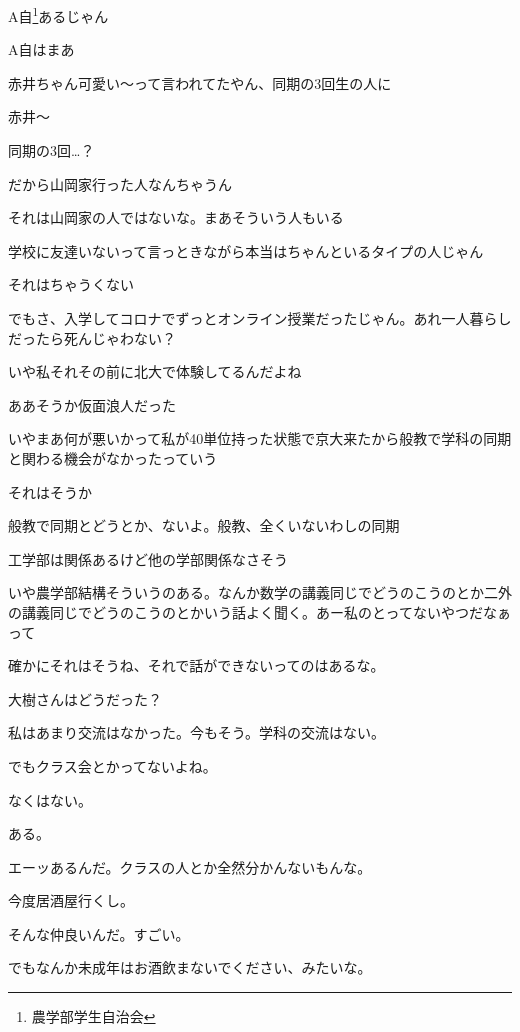 \begin{multicols}{3}
A自\footnote{農学部学生自治会}あるじゃん

A自はまあ

赤井ちゃん可愛い～って言われてたやん、同期の3回生の人に

赤井～

同期の3回…？

だから山岡家行った人なんちゃうん

それは山岡家の人ではないな。まあそういう人もいる

学校に友達いないって言っときながら本当はちゃんといるタイプの人じゃん

それはちゃうくない

でもさ、入学してコロナでずっとオンライン授業だったじゃん。あれ一人暮らしだったら死んじゃわない？

いや私それその前に北大で体験してるんだよね

ああそうか仮面浪人だった

いやまあ何が悪いかって私が40単位持った状態で京大来たから般教で学科の同期と関わる機会がなかったっていう

それはそうか

般教で同期とどうとか、ないよ。般教、全くいないわしの同期

工学部は関係あるけど他の学部関係なさそう

いや農学部結構そういうのある。なんか数学の講義同じでどうのこうのとか二外の講義同じでどうのこうのとかいう話よく聞く。あー私のとってないやつだなぁって

確かにそれはそうね、それで話ができないってのはあるな。

大樹さんはどうだった？

私はあまり交流はなかった。今もそう。学科の交流はない。

でもクラス会とかってないよね。

なくはない。

ある。

エーッあるんだ。クラスの人とか全然分かんないもんな。

今度居酒屋行くし。

そんな仲良いんだ。すごい。

でもなんか未成年はお酒飲まないでください、みたいな。


\end{multicols}

